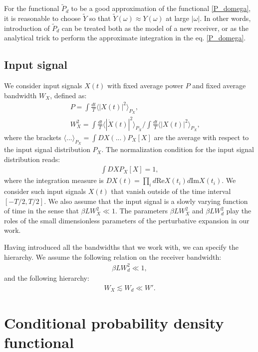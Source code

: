 \documentclass{article}
\begin{document}
 For the functional $\tilde{P}_{d}$ to be a good approximation of the functional \eqref{P_domega}, it is reasonable to choose $\tilde{Y}$ so that $\tilde{Y}(\omega) \approx Y(\omega)$ at large $|\omega|$. In other words, introduction of $\tilde{P}_{d}$ can be treated both as the model of a new receiver, or as the analytical trick to perform the approximate integration in the eq. \eqref{P_domega}.
\subsection{Input signal}
We consider input signals $X(t)$ with fixed average power $P$ and fixed average bandwidth $W_{X}$, defined as: 
\begin{eqnarray}
    &&P = \int \frac{dt}{T} \langle |X(t)|^{2} \rangle_{P_{X}}, \\
    &&W_{X}^{2} = \int \frac{dt}{T} \langle |\dot{X}(t)|^{2} \rangle_{P_{X}}\bigg/\int \frac{dt}{T} \langle |X(t)|^{2} \rangle_{P_{X}},
\end{eqnarray}
where the brackets $\langle ... \rangle_{P_{X}} = \int DX (...)P_{X}[X]$ are the average with respect to the input signal distribution $P_{X}$. The normalization condition for the input signal distribution reads:
\begin{eqnarray}
    \int DX P_{X}[X] = 1, 
\end{eqnarray}
where the integration measure is $DX(t) = \prod_{i} d\textrm{Re} X(t_{i})d\textrm{Im} X(t_{i})$. We consider such input signals $X(t)$ that vanish outside of the time interval $\left[-T/2, T/2\right]$. We also assume that the input signal is a slowly varying function of time in the sense that $\beta L W_{X}^{2} \ll 1$. The parameters $\beta L W_{X}^{2}$ and $\beta L W_{d}^{2}$ play the roles of the small dimensionless parameters of the perturbative expansion in our work. 

Having introduced all the bandwidths that we work with, we can specify the hierarchy. We assume the following relation on the receiver bandwidth:
\begin{eqnarray}
    \beta L W_{d}^{2} \ll 1,
\end{eqnarray}
and the following hierarchy: 
\begin{eqnarray}\label{hierarchy}
    W_{X} \lesssim W_{d} \ll W'.
\end{eqnarray}

\section{Conditional probability density functional}
\end{document}
